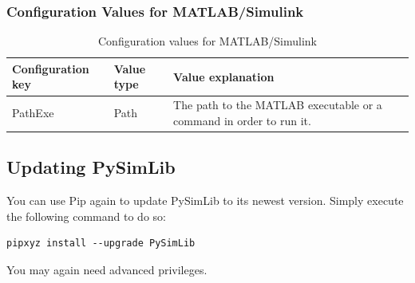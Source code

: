 \subsubsection{Configuration Values for MATLAB/Simulink}
\begin{table}[h]
	\centering
	\begin{tabular}{| l | l | p{10cm} |}
		\hline
		\textbf{Configuration key} & \textbf{Value type} & \textbf{Value explanation} \\ \hline
		
		PathExe & Path & The path to the MATLAB executable or a command in order to run it. \\ \hline
	\end{tabular}
	\caption{Configuration values for MATLAB/Simulink}
\end{table}


\subsection{Updating PySimLib}
You can use Pip again to update PySimLib to its newest version.
Simply execute the following command to do so:
\begin{lstlisting}
pipxyz install --upgrade PySimLib
\end{lstlisting}
You may again need advanced privileges.
